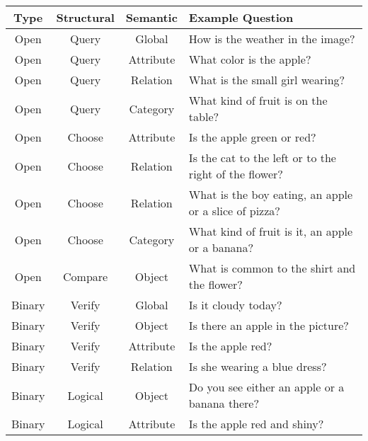 \begin{table}[htbp]
    \centering
    \begin{footnotesize}
    \begin{tabularx}{\linewidth}{cccL}
        \toprule
        \textbf{Type} & \textbf{Structural} & \textbf{Semantic} & \textbf{Example Question}\\
        \midrule
        Open & Query & Global & How is the weather in the image?\\
        Open & Query & Attribute & What color is the apple?\\
        Open & Query & Relation & What is the small girl wearing?\\
        Open & Query & Category & What kind of fruit is on the table?\\
        Open & Choose & Attribute & Is the apple green or red?\\
        Open & Choose & Relation & Is the cat to the left or to the right of the flower?\\
        Open & Choose & Relation & What is the boy eating, an apple or a slice of pizza?\\
        Open & Choose & Category & What kind of fruit is it, an apple or a banana?\\
        Open & Compare & Object & What is common to the shirt and the flower?\\
        Binary & Verify & Global & Is it cloudy today?\\
        Binary & Verify & Object & Is there an apple in the picture?\\
        Binary & Verify & Attribute & Is the apple red?\\
        Binary & Verify & Relation & Is she wearing a blue dress?\\
        Binary & Logical & Object & Do you see either an apple or a banana there?\\
        Binary & Logical & Attribute & Is the apple red and shiny?\\

\end{tabularx}
\end{footnotesize}
\end{table}
